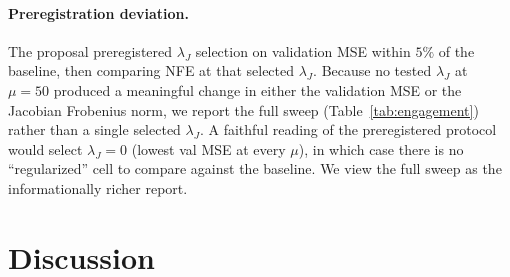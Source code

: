 \documentclass[11pt]{article}
\theoremstyle{plain}
\theoremstyle{definition}
\begin{document}
\paragraph{Preregistration deviation.}
The proposal preregistered $\lambda_J$ selection on validation MSE within
$5\%$ of the baseline, then comparing NFE at that selected $\lambda_J$.
Because no tested $\lambda_J$ at $\mu = 50$ produced a meaningful change in
either the validation MSE or the Jacobian Frobenius norm, we report the full
sweep (Table~\ref{tab:engagement}) rather than a single selected $\lambda_J$.
A faithful reading of the preregistered protocol would select $\lambda_J = 0$
(lowest val MSE at every $\mu$), in which case there is no ``regularized''
cell to compare against the baseline. We view the full sweep as the
informationally richer report.

\section{Discussion}
\label{sec:discussion}
\end{document}
